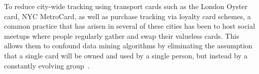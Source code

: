 \documentclass{IOS-Book-Article}     %
\newcommand{\tbox}[3][red]{{
\color{#1}\noindent{
   \fbox{\scriptsize{ {\bf #2} \textsl{#3}}}
   \vspace{2pt}
}
}}
\newcommand{\todo}[1]{\tbox{TODO:}{#1}}
\begin{document}
To reduce city-wide tracking using transport cards such as the London Oyster
card, NYC MetroCard, as well as  purchase tracking via loyalty card schemes, a
common practice that has arisen in several of these cities has been to host
social meetups where people regularly gather and swap their valueless cards. 
This allows them to confound data mining algorithms by eliminating the
assumption that a single card will be owned and used by a single person, but instead by a
constantly evolving group~\cite{lockton}.

% 



\end{document}
